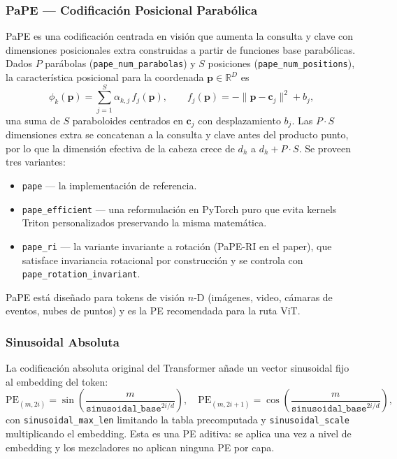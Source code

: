 \subsubsection{PaPE --- Codificación Posicional Parabólica}

PaPE \citep{ohrstrom_pape_2026} es una codificación centrada en visión que
aumenta la consulta y clave con dimensiones posicionales extra construidas
a partir de funciones base parabólicas. Dados $P$ parábolas
(\texttt{pape\_num\_parabolas}) y $S$ posiciones
(\texttt{pape\_num\_positions}), la característica posicional para la
coordenada $\mathbf{p} \in \mathbb{R}^D$ es
\[
\phi_k(\mathbf{p}) = \sum_{j=1}^{S} \alpha_{k,j}\, f_j(\mathbf{p}), \qquad
f_j(\mathbf{p}) = -\|\mathbf{p} - \mathbf{c}_j\|^2 + b_j,
\]
una suma de $S$ paraboloides centrados en $\mathbf{c}_j$ con
desplazamiento $b_j$. Las $P \cdot S$ dimensiones extra se concatenan a
la consulta y clave antes del producto punto, por lo que la dimensión
efectiva de la cabeza crece de $d_h$ a $d_h + P \cdot S$. Se proveen tres
variantes:

\begin{itemize}
\item \texttt{pape} --- la implementación de referencia.
\item \texttt{pape\_efficient} --- una reformulación en PyTorch puro que
   evita kernels Triton personalizados preservando la misma matemática.
\item \texttt{pape\_ri} --- la variante invariante a rotación
   (PaPE-RI en el paper), que satisface invariancia rotacional por
   construcción y se controla con \texttt{pape\_rotation\_invariant}.
\end{itemize}

PaPE está diseñado para tokens de visión $n$-D (imágenes, video, cámaras
de eventos, nubes de puntos) y es la PE recomendada para la ruta ViT.

\subsubsection{Sinusoidal Absoluta}

La codificación absoluta original del Transformer
\citep{vaswani_attention_2017} añade un vector sinusoidal fijo al
embedding del token:
\[
\text{PE}_{(m,2i)} = \sin\!\left(\frac{m}{\texttt{sinusoidal\_base}^{2i/d}}\right), \quad
\text{PE}_{(m,2i+1)} = \cos\!\left(\frac{m}{\texttt{sinusoidal\_base}^{2i/d}}\right),
\]
con \texttt{sinusoidal\_max\_len} limitando la tabla precomputada y
\texttt{sinusoidal\_scale} multiplicando el embedding. Esta es una PE
aditiva: se aplica una vez a nivel de embedding y los mezcladores no
aplican ninguna PE por capa.


